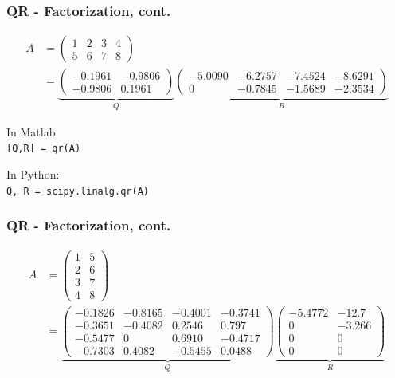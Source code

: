 \documentclass{beamer}
\begin{document}
\begin{frame}\frametitle{QR - Factorization, cont.}
	\begin{example}
		\begin{align*}
		A &= \begin{pmatrix}
				1 & 2 & 3 & 4\\
				5 & 6 & 7 & 8
			\end{pmatrix} \\
		&= 
			\underbrace{
				\begin{pmatrix}
					-0.1961 & -0.9806 \\
					-0.9806 & 0.1961 
		  		\end{pmatrix}
		  	}_Q
		  	\underbrace{
		  		\begin{pmatrix}
					-5.0090 & -6.2757 & -7.4524 & -8.6291\\
					0 & -0.7845 & -1.5689 & -2.3534
		  		\end{pmatrix}
		  	}_R
		\end{align*}
	\end{example}
		
	\vfill
	
	In Matlab: \\
	\texttt{[Q,R] = qr(A)}
	
	\vfill
	
	In Python: \\
	\texttt{Q, R = scipy.linalg.qr(A)}
\end{frame}

\begin{frame}\frametitle{QR - Factorization, cont.}
	\begin{example}
		\begin{align*}
			A &= \begin{pmatrix}
					1 & 5\\
					2 & 6\\
					3 & 7\\
					4 & 8
				\end{pmatrix} \\
			&=  \underbrace{
				\begin{pmatrix}
					-0.1826 & -0.8165 & -0.4001 & -0.3741\\
					-0.3651 & -0.4082 & 0.2546 & 0.797\\
					-0.5477 & 0 & 0.6910 & -0.4717\\
					-0.7303 & 0.4082 & -0.5455 & 0.0488
				\end{pmatrix}}_{Q}
				\underbrace{
				\begin{pmatrix}
					-5.4772 & -12.7\\
					0 & -3.266\\
					0 & 0\\
					0 & 0
				\end{pmatrix}}_{R}
		\end{align*}
	\end{example}	
\end{frame}
\end{document}
